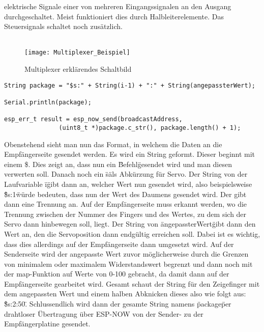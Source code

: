 \documentclass[titlepage,12pt,twoside]{article}
\begin{document}
elektrische Signale einer von mehreren Eingangssignalen an den Ausgang 
durchgeschaltet. Meist funktioniert dies durch Halbleiterelemente. Das Steuersignals
schaltet noch zusätzlich. \\
\\
\begin{figure}[H]
	\begin{center}
		\scalebox{1.2}
		{\texttt{[image: Multiplexer\_Beispiel]}}
		\caption{Multiplexer erklärendes Schaltbild}
		\label{fig:Multiplexer_Beispiel}	
	\end{center}
\end{figure}
\hfill \break
\begin{lstlisting}
String package = "$s:" + String(i-1) + ":" + String(angepassterWert);

Serial.println(package);

esp_err_t result = esp_now_send(broadcastAddress, 
        	   (uint8_t *)package.c_str(), package.length() + 1);
\end{lstlisting}
\hfill \break
Obenstehend sieht man nun das Format, in welchem die Daten an die Empfängerseite 
gesendet werden. Es wird ein String geformt. Dieser beginnt mit einem \$. Dies zeigt 
an, dass nun ein \"Befehl\" gesendet wird und man diesen verwerten soll. Danach noch 
ein \"s\" als Abkürzung für Servo. Der String von der Laufvariable \"i\" gibt dann an, 
welcher Wert nun gesendet wird, also beispielsweise \"\$s:1\" würde bedeuten, dass nun 
der Wert des Daumens gesendet wird. Der gibt dann eine Trennung an. Auf der 
Empfängerseite muss erkannt werden, wo die Trennung zwischen der Nummer des Fingers 
und des Wertes, zu dem sich der Servo dann hinbewegen soll, liegt. Der String von 
\"angepassterWert\" gibt dann den Wert an, den die Servoposition dann endgültig 
erreichen soll. Dabei ist es wichtig, dass dies allerdings auf der Empfängerseite 
dann umgesetzt wird. Auf der Senderseite wird der angepasste Wert zuvor 
möglicherweise durch die Grenzen von minimalem oder maximalem Widerstandswert 
begrenzt und dann noch mit der map-Funktion auf Werte von 0-100 gebracht, da damit 
dann auf der Empfängerseite gearbeitet wird. Gesamt schaut der String für den 
Zeigefinger mit dem angepassten Wert und einem halben Abknicken dieses also wie 
folgt aus: \"\$s:2:50\". Schlussendlich wird dann der gesamte String namens 
\"package\" per drahtloser Übertragung über ESP-NOW von der Sender- zu der 
Empfängerplatine gesendet. \\
\\
\end{document}
